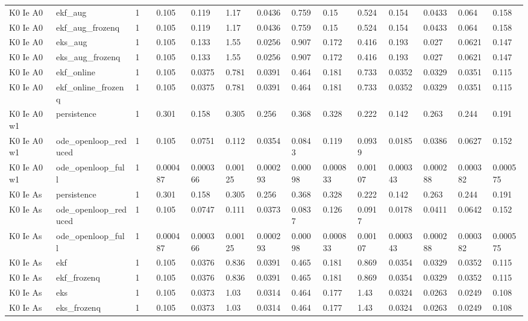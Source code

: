 \begin{table}[t]
\begin{tabular}{lllllllllllllll}
K0 Ie A0 & ekf\_aug & 1 &  & 0.105 & 0.119 & 1.17 & 0.0436 & 0.759 & 0.15 & 0.524 & 0.154 & 0.0433 & 0.064 & 0.158 \\
K0 Ie A0 & ekf\_aug\_frozenq & 1 &  & 0.105 & 0.119 & 1.17 & 0.0436 & 0.759 & 0.15 & 0.524 & 0.154 & 0.0433 & 0.064 & 0.158 \\
K0 Ie A0 & eks\_aug & 1 &  & 0.105 & 0.133 & 1.55 & 0.0256 & 0.907 & 0.172 & 0.416 & 0.193 & 0.027 & 0.0621 & 0.147 \\
K0 Ie A0 & eks\_aug\_frozenq & 1 &  & 0.105 & 0.133 & 1.55 & 0.0256 & 0.907 & 0.172 & 0.416 & 0.193 & 0.027 & 0.0621 & 0.147 \\
K0 Ie A0 & ekf\_online & 1 &  & 0.105 & 0.0375 & 0.781 & 0.0391 & 0.464 & 0.181 & 0.733 & 0.0352 & 0.0329 & 0.0351 & 0.115 \\
K0 Ie A0 & ekf\_online\_frozenq & 1 &  & 0.105 & 0.0375 & 0.781 & 0.0391 & 0.464 & 0.181 & 0.733 & 0.0352 & 0.0329 & 0.0351 & 0.115 \\
K0 Ie A0 w1 & persistence & 1 &  & 0.301 & 0.158 & 0.305 & 0.256 & 0.368 & 0.328 & 0.222 & 0.142 & 0.263 & 0.244 & 0.191 \\
K0 Ie A0 w1 & ode\_openloop\_reduced & 1 &  & 0.105 & 0.0751 & 0.112 & 0.0354 & 0.0843 & 0.119 & 0.0939 & 0.0185 & 0.0386 & 0.0627 & 0.152 \\
K0 Ie A0 w1 & ode\_openloop\_full & 1 &  & 0.000487 & 0.000366 & 0.00125 & 0.000293 & 0.00098 & 0.000833 & 0.00107 & 0.000343 & 0.000288 & 0.000382 & 0.000575 \\
K0 Ie As & persistence & 1 &  & 0.301 & 0.158 & 0.305 & 0.256 & 0.368 & 0.328 & 0.222 & 0.142 & 0.263 & 0.244 & 0.191 \\
K0 Ie As & ode\_openloop\_reduced & 1 &  & 0.105 & 0.0747 & 0.111 & 0.0373 & 0.0837 & 0.126 & 0.0917 & 0.0178 & 0.0411 & 0.0642 & 0.152 \\
K0 Ie As & ode\_openloop\_full & 1 &  & 0.000487 & 0.000366 & 0.00125 & 0.000293 & 0.00098 & 0.000833 & 0.00107 & 0.000343 & 0.000288 & 0.000382 & 0.000575 \\
K0 Ie As & ekf & 1 &  & 0.105 & 0.0376 & 0.836 & 0.0391 & 0.465 & 0.181 & 0.869 & 0.0354 & 0.0329 & 0.0352 & 0.115 \\
K0 Ie As & ekf\_frozenq & 1 &  & 0.105 & 0.0376 & 0.836 & 0.0391 & 0.465 & 0.181 & 0.869 & 0.0354 & 0.0329 & 0.0352 & 0.115 \\
K0 Ie As & eks & 1 &  & 0.105 & 0.0373 & 1.03 & 0.0314 & 0.464 & 0.177 & 1.43 & 0.0324 & 0.0263 & 0.0249 & 0.108 \\
K0 Ie As & eks\_frozenq & 1 &  & 0.105 & 0.0373 & 1.03 & 0.0314 & 0.464 & 0.177 & 1.43 & 0.0324 & 0.0263 & 0.0249 & 0.108 \\

\end{tabular}
\end{table}
